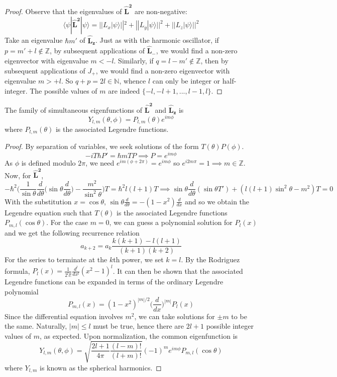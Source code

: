 \documentclass[a4paper]{article}
\begin{document}
\begin{proof}
Observe that the eigenvalues of $\mathbf{\hat{L}^2}$ are non-negative:
$$\langle\psi|\mathbf{\hat{L}^2}|\psi\rangle=||L_x|\psi\rangle||^2+||L_y|\psi\rangle||^2+||L_z|\psi\rangle||^2$$
Take an eigenvalue $\hbar m'$ of $\mathbf{\hat{L}_z}$. Just as with the harmonic oscillator, if $p=m'+l\notin\mathbb{Z}$, by subsequent applications of $\mathbf{\hat{L}_-}$, we would find a non-zero eigenvector with eigenvalue $m<-l$. Similarly, if $q=l-m'\notin\mathbb{Z}$, then by subsequent applications of $J_+$, we would find a non-zero eigenvector with eigenvalue $m>+l$. So $q+p=2l\in\mathbb{N}$, whence $l$ can only be integer or half-integer. The possible values of $m$ are indeed $\{-l,-l+1,...,l-1,l\}$.
\end{proof}
\begin{cor}
The family of simultaneous eigenfunctions of $\mathbf{\hat{L}^2}$ and $\mathbf{\hat{L}_z}$ is
$$Y_{l,m}(\theta,\phi)=P_{l,m}(\theta)e^{im\phi}$$
where $P_{l,m}(\theta)$ is the associated Legendre functions.
\end{cor}
\begin{proof}
By separation of variables, we seek solutions of the form $T(\theta)P(\phi)$. 
$$-iT\hbar P'=\hbar mTP\implies P=e^{im\phi}$$
As $\phi$ is defined modulo $2\pi$, we need $e^{im(\phi+2\pi)}=e^{im\phi}$ so $e^{i2m\pi}=1\implies m\in\mathbb{Z}$. Now, for $\mathbf{\hat{L}^2}$,
$$-\hbar^2\bigg(\frac{1}{\sin\theta}\frac{d}{d\theta}\bigg(\sin\theta\frac{d}{d\theta}\bigg)-\frac{m^2}{\sin^2\theta}\bigg)T=\hbar^2l(l+1) T\implies\sin\theta\frac{d}{d\theta}(\sin\theta T')+(l(l+1)\sin^2\theta-m^2)T=0$$
With the substitution $x=\cos\theta$,  $\sin\theta\frac{d}{d\theta}=-(1-x^2)\frac{d}{dx}$ and so we obtain the Legendre equation such that $T(\theta)$ is the associated Legendre functions $P_{m,l}(\cos\theta)$. For the case $m=0$, we can guess a polynomial solution for $P_l(x)$ and we get the following recurrence relation
$$a_{k+2}=a_k\frac{k(k+1)-l(l+1)}{(k+1)(k+2)}$$
For the series to terminate at the $k$th power, we set $k=l$. By the Rodriguez formula, $P_l(x)=\frac{1}{2^ll!}\frac{d^l}{dx^l}(x^2-1)^l$. It can then be shown that the associated Legendre functions can be expanded in terms of the ordinary Legendre polynomial
$$P_{m,l}(x)=(1-x^2)^{|m|/2}\bigg(\frac{d}{dx}\bigg)^{|m|}P_l(x)$$
Since the differential equation involves $m^2$, we can take solutions for $\pm m$ to be the same. Naturally, $|m|\leq l$ must be true, hence there are $2l+1$ possible integer values of $m$, as expected. Upon normalization, the common eigenfunction is
$$Y_{l,m}(\theta,\phi)=\sqrt{\frac{2l+1}{4\pi}\frac{(l-m)!}{(l+m)!}}(-1)^me^{im\phi}P_{m,l}(\cos\theta)$$
where $Y_{l,m}$ is known as the spherical harmonics.
\end{proof}
\end{document}
